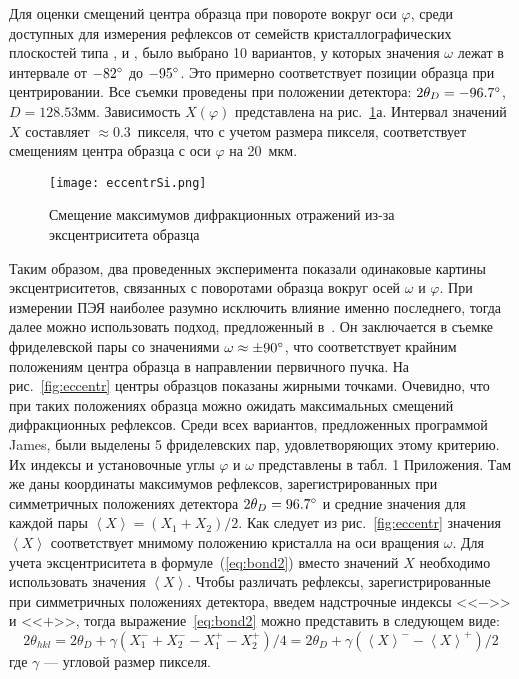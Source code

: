 Для оценки смещений центра образца при повороте вокруг оси $\varphi$, среди доступных для измерения рефлексов от семейств кристаллографических плоскостей типа ,  и , было выбрано 10 вариантов, у которых значения $\omega$ лежат в интервале от $-82^\circ$ до $-95^\circ$.
Это примерно соответствует позиции образца при центрировании.
Все съемки проведены при положении детектора: $2\theta_D = -96.7^\circ$, $D = 128.53\unit{мм}$.
Зависимость $X(\varphi)$ представлена на рис.~\ref{fig:eccentrSi}а.
Интервал значений $X$ составляет $\approx 0.3$~пикселя, что с учетом размера пикселя, соответствует смещениям центра образца с оси $\varphi$ на 20~мкм.

\begin{figure}[ht!]
    \centering
    \texttt{[image: eccentrSi.png]}
    \caption{Смещение максимумов дифракционных отражений из-за эксцентриситета образца}%
    \label{fig:eccentrSi}
\end{figure}

Таким образом, два проведенных эксперимента показали одинаковые картины эксцентриситетов, связанных с поворотами образца вокруг осей $\omega$ и $\varphi$.
При измерении ПЭЯ наиболее разумно исключить влияние именно последнего, тогда далее можно использовать подход, предложенный в~\cite{Ponomarev:1969}.
Он заключается в съемке фриделевской пары со значениями $\omega \approx \pm 90^\circ$, что соответствует крайним положениям центра образца в направлении первичного пучка.
На рис.~\ref{fig:eccentr} центры образцов показаны жирными точками.
Очевидно, что при таких положениях образца можно ожидать максимальных смещений дифракционных рефлексов.
Среди всех вариантов, предложенных программой James, были выделены 5 фриделевских пар, удовлетворяющих этому критерию.
Их индексы и установочные углы $\varphi$ и $\omega$ представлены в табл. 1 Приложения.
Там же даны координаты максимумов рефлексов, зарегистрированных при симметричных положениях детектора $2\theta_D = 96.7^\circ$ и средние значения для каждой пары $\left<X\right> = (X_1 + X_2) / 2$.
Как следует из рис.~\ref{fig:eccentr} значения $\left<X\right>$ соответствует мнимому положению кристалла на оси вращения $\omega$.
Для учета эксцентриситета в формуле~(\ref{eq:bond2}) вместо значений $X$ необходимо использовать значения $\left<X\right>$.
Чтобы различать рефлексы, зарегистрированные при симметричных положениях детектора, введем надстрочные индексы <<$-$>> и <<$+$>>, тогда выражение~\ref{eq:bond2} можно представить в следующем виде:
\begin{equation}\label{eq:bond4}
    2\theta_{hkl} = 2\theta_D + \gamma (X_1^- + X_2^- - X_1^+ - X_2^+) / 4 = 2\theta_D + \gamma (\left<X\right>^- - \left<X\right>^+) / 2
\end{equation}
где $\gamma$ --- угловой размер пикселя.


